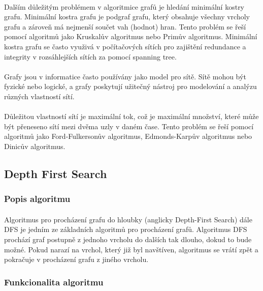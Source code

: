 \documentclass[12pt]{article}
\begin{document}
\paragraph{}
Dalším důležitým problémem v algoritmice grafů je hledání minimální kostry grafu. Minimální 
kostra grafu je podgraf grafu, který obsahuje všechny vrcholy grafu a zároveň má nejmenší 
součet vah (hodnot) hran. Tento problém se řeší pomocí algoritmů jako Kruskalův algoritmus nebo Primův 
algoritmus. Minimální kostra grafu se často využivá v počítačových sítích pro zajištění redundance
a integrity v rozsáhlejších sítích za pomocí spanning tree.
\paragraph{}
Grafy jsou v informatice často používány jako model pro sítě. Sítě mohou být fyzické nebo 
logické, a grafy poskytují užitečný nástroj pro modelování a analýzu různých vlastností sítí.
\paragraph{}
Důležitou vlastností sítí je maximální tok, což je maximální množství, které může být přeneseno 
sítí mezi dvěma uzly v daném čase. Tento problém se řeší pomocí algoritmů jako Ford-Fulkersonův 
algoritmus, Edmonds-Karpův algoritmus nebo Dinicův algoritmus.

\subsection{Depth First Search}
\subsubsection{Popis algoritmu}
\paragraph{}
Algoritmus pro procházení grafu do hloubky (anglicky Depth-First Search) dále DFS
je jedním ze základních algoritmů pro procházení grafů. Algoritmus DFS prochází 
graf postupně z jednoho vrcholu do dalších tak dlouho, dokud to bude možné. 
Pokud narazí na vrchol, který již byl navštíven, algoritmus se vrátí zpět a pokračuje 
v procházení grafu z jiného vrcholu.

\subsubsection{Funkcionalita algoritmu}
\end{document}
